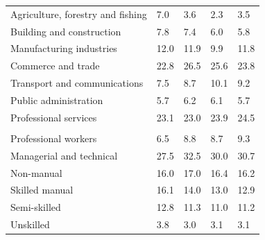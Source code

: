 \documentclass{article}
\begin{document}
\begin{table}[h]
\begin{tabular}{KTTTT}
    \hline
Agriculture, forestry and fishing  & 7.0& 3.6& 2.3& 3.5\\
Building and construction & 7.8& 7.4& 6.0& 5.8\\
Manufacturing industries & 12.0& 11.9&  9.9& 11.8\\
Commerce and trade  & 22.8& 26.5& 25.6& 23.8\\
Transport and communications  &  7.5&  8.7& 10.1&  9.2\\
Public administration & 5.7& 6.2& 6.1& 5.7\\
Professional services & 23.1& 23.0& 23.9& 24.5\\
\hline
    \\ 
    \hline
Professional workers  & 6.5& 8.8 & 8.7& 9.3\\
Managerial and technical & 27.5& 32.5& 30.0& 30.7\\
Non-manual & 16.0& 17.0& 16.4& 16.2\\
Skilled manual & 16.1& 14.0& 13.0& 12.9\\
Semi-skilled & 12.8& 11.3& 11.0& 11.2\\
Unskilled  & 3.8& 3.0& 3.1& 3.1\\
\end{tabular}
\end{table}
\pagebreak
\end{document}
